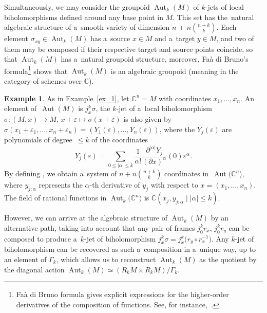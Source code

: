 \documentclass[10pt,a4paper]{amsart}
\numberwithin{equation}{section}
\theoremstyle{definition}
\newtheorem{Example}[Theorem]{Example}
\begin{document}
Simultaneously, we may consider the groupoid $\operatorname{Aut}_k(M)$ of $k$-jets of local biholomorphisms defined around any base point in $M$. This set has the~natural algebraic structure of a~smooth variety of dimension $n$ + $n\binom{n+k}{k}$. Each element $\sigma_{xy}\in \operatorname{Aut}_k(M)$ has a~source $x\in M$ and a~target $y\in M$, and two of them may be composed if their respective target and source points coincide, so that $\operatorname{Aut}_k(M)$ has a~natural groupoid structure, moreover, Fa\`a di Bruno's formula\footnote{Fa\`a di Bruno formula gives explicit expressions for the higher-order derivatives of the composition of functions. See, for instance,~\cite{weisstein2003faa}.} shows that $\operatorname{Aut}_k(M)$ is an algebraic groupoid (meaning in the category of schemes over $\mathbb C$).

\begin{Example}
As in Example~\ref{ex_1}, let $\mathbb C^n = M$ with coordinates $x_1, \dots, x_n$. An element of~${\operatorname{Aut}(M)}$ is $j^k_x\sigma$, the $k$-jet of a~local biholomorphism $\sigma\colon (M,x)\to M$, $x+ \varepsilon \mapsto \sigma(x+ \varepsilon)$ is also given by $\sigma(x_1+ \varepsilon_1,\dots,x_n+ \varepsilon_n) = (Y_1(\varepsilon),\dots,Y_n(\varepsilon))$, where the $Y_j(\varepsilon)$ are polynomials of degree~$\leq k$ of the coordinates
\[
Y_j(\varepsilon) = \sum_{0\leq|\alpha|\leq k}\frac{1}{\alpha!}\frac{\partial^{|\alpha|}Y_j}{(\partial x)^\alpha}(0)\varepsilon^\alpha.
\]
By defining ,
we obtain a~system of $n + n\binom{n+k}{k}$ coordinates  in~$\operatorname{Aut}(\mathbb C^n$), where $y_{j:\alpha}$ represents the $\alpha$-th derivative of $y_j$ with respect to $x = (x_1,\dots,x_n)$. The field of rational functions in $\operatorname{Aut}_k\bigl(\mathbb C^n\bigr)$ is $\mathbb C(x_j, y_{j:\alpha}\mid |\alpha|\leq k)$.
\end{Example}

However, we can arrive at the algebraic structure of $\operatorname{Aut}_k(M)$ by an alternative path, taking into account that any pair of frames $j_0^kr_x$, $j_0^kr_y$ can be composed to produce a~$k$-jet of biholomorphism $j_x^k\sigma = j_x^k\bigl(r_y \circ r_x^{-1}\bigr)$. Any $k$-jet of biholomorphism can be recovered as such a~composition in a~unique way, up to an element of $\Gamma_k$, which allows us to reconstruct $\operatorname{Aut}_k(M)$ as the quotient by the diagonal action $\operatorname{Aut}_k(M) \simeq (R_kM \times R_kM )/\Gamma_k$.
\end{document}
